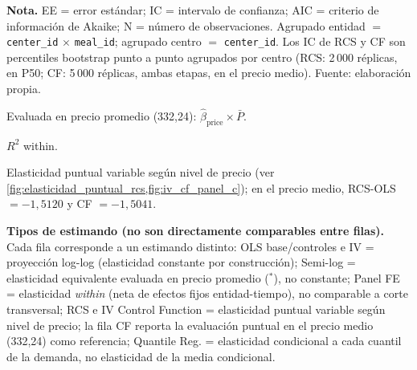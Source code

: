 \documentclass[doc, a4paper, biblatex, floatsintext, longtable, babel]{apa7}
\begin{document}
\begin{table}[!htbp]
\begin{threeparttable}
\begin{tablenotes}
\footnotesize
\item \textbf{Nota.} EE = error est\'andar; IC = intervalo de confianza; AIC = criterio de informaci\'on de Akaike; N = n\'umero de observaciones. Agrupado entidad $=$ \texttt{center\_id} $\times$ \texttt{meal\_id}; agrupado centro $=$ \texttt{center\_id}. Los IC de RCS y CF son percentiles bootstrap punto a punto agrupados por centro (RCS: 2\,000 réplicas, en P50; CF: 5\,000 réplicas, ambas etapas, en el precio medio). Fuente: elaboraci\'on propia.
\item[$^*$] Evaluada en precio promedio (332,24): $\hat{\beta}_{\text{price}} \times \bar{P}$.
\item[$^\dagger$] $R^2$ within.
\item[$^\ddagger$] Elasticidad puntual variable según nivel de precio (ver \cref{fig:elasticidad_puntual_rcs,fig:iv_cf_panel_c}); en el precio medio, RCS-OLS $=-1,5120$ y CF $=-1,5041$.
\item \textbf{Tipos de estimando (no son directamente comparables entre filas).} Cada fila corresponde a un estimando distinto: OLS base/controles e IV = proyección log-log (elasticidad constante por construcción); Semi-log = elasticidad equivalente evaluada en precio promedio ($^*$), no constante; Panel FE = elasticidad \emph{within} (neta de efectos fijos entidad-tiempo), no comparable a corte transversal; RCS e IV Control Function = elasticidad puntual variable según nivel de precio; la fila CF reporta la evaluación puntual en el precio medio (332,24) como referencia; Quantile Reg. = elasticidad condicional a cada cuantil de la demanda, no elasticidad de la media condicional.
\end{tablenotes}
\end{threeparttable}
\end{table}
\end{document}
